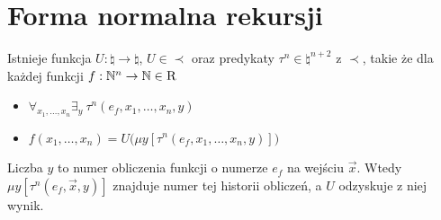 \section{Forma normalna rekursji}
\begin{theorem}
    Istnieje funkcja \( U: \natural \to \natural \), \( U \in \prec \) oraz predykaty \( \tau^n \in \natural^{n+2} \) z \( \prec \), takie że dla każdej funkcji \( f: \mathbb{N}^n \to \mathbb{N} \in \textsc{R} \)
    \begin{itemize}
        \item \( \forall_{x_1, \dots, x_n} \exists_y \ \tau^n(e_f,x_1,\dots,x_n,y) \)
        \item \( f(x_1, \dots, x_n) = U\big(\mu y [\tau^n(e_f,x_1,\dots,x_n,y)]\big) \)
    \end{itemize}
    Liczba \(y\) to numer obliczenia funkcji o numerze \(e_f\) na wejściu \(\vec{x}\). Wtedy \( \mu y [\tau^n(e_f,\vec{x},y)] \) znajduje numer tej historii obliczeń, a \(U\) odzyskuje z niej wynik.
\end{theorem}
